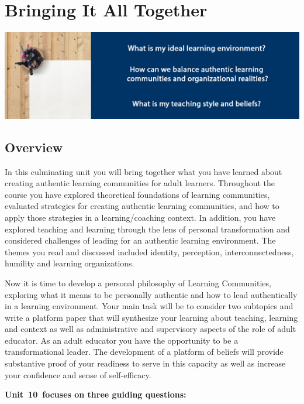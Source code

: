 \documentclass[
]{book}
\begin{document}
\hypertarget{bringing-it-all-together}{%
\chapter{Bringing It All Together}\label{bringing-it-all-together}}

\includegraphics{assets/unit10/BannerUnit10.jpg}

\hypertarget{overview-9}{%
\section*{Overview}\label{overview-9}}

In this culminating unit you will bring together what you have learned about creating authentic learning communities for adult learners. Throughout the course you have explored theoretical foundations of learning communities, evaluated strategies for creating authentic learning communities, and how to apply those strategies in a learning/coaching context. In addition, you have explored teaching and learning through the lens of personal transformation and considered challenges of leading for an authentic learning environment. The themes you read and discussed included identity, perception, interconnectedness, humility and learning organizations.

Now it is time to develop a personal philosophy of Learning Communities, exploring what it means to be personally authentic and how to lead authentically in a learning environment. Your main task will be to consider two subtopics and write a platform paper that will synthesize your learning about teaching, learning and context as well as administrative and supervisory aspects of the role of adult educator. As an adult educator you have the opportunity to be a transformational leader. The development of a platform of beliefs will provide substantive proof of your readiness to serve in this capacity as well as increase your confidence and sense of self-efficacy.

\textbf{Unit~10~focuses on three guiding questions:}
\end{document}
